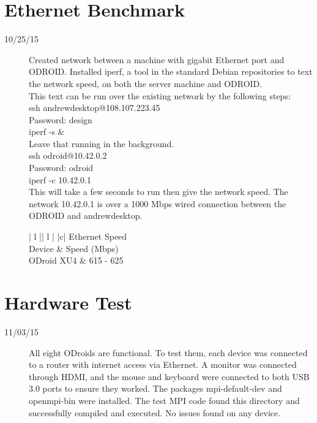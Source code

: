 \section{Ethernet Benchmark}
\begin{description}
\item [10/25/15] Created network between a machine with gigabit Ethernet port and ODROID. Installed iperf, a tool in the standard Debian repositories to text the network speed, on both the server machine and ODROID. \\

This text can be run over the existing network by the following steps: \\
ssh andrewdesktop@108.107.223.45 \\
Password: design \\
iperf -s \& \\
Leave that running in the background. \\
ssh odroid@10.42.0.2 \\
Password: odroid \\
iperf -c 10.42.0.1 \\
This will take a few seconds to run then give the network speed. The network 10.42.0.1 is over a 1000 Mbps wired connection between the ODROID and andrewdesktop. \\

\begin{center}
\begin{tabular}{ | l || l | }
\hline
{}
{ |c| }{ Ethernet Speed } \\
\hline
Device & Speed (Mbps) \\
\hline
ODroid XU4 & 615 - 625 \\
\hline
\end{tabular}
\end{center}

\end{description}

\section{Hardware Test}
\begin{description}
\item [11/03/15] All eight ODroids are functional. To test them, each device was connected to a router with internet access via Ethernet. A monitor was connected through HDMI, and the mouse and keyboard were connected to both USB 3.0 ports to ensure they worked. The packages mpi-default-dev and openmpi-bin were installed. The test MPI code found this directory and successfully compiled and executed. No issues found on any device. \\
\end{description}

